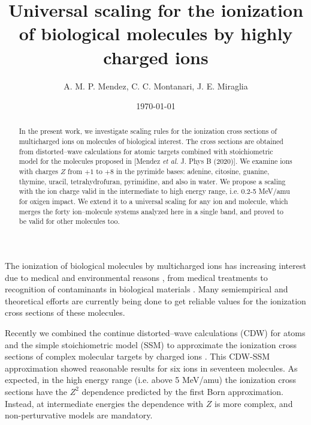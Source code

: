 \documentclass[10pt,showpacs,showkeys,twocolumn]{revtex4}
\begin{document}
\title[Universal scaling for the ionization of biological molecules]{
Universal scaling for the ionization of biological molecules by highly charged ions}
\author{A. M. P. Mendez, C. C. Montanari, J. E. Miraglia}

\date{\today}%

\begin{abstract}
In the present work, we investigate scaling rules for the ionization cross sections of multicharged ions on molecules of biological interest. The cross sections are obtained from distorted--wave calculations for atomic targets
combined with stoichiometric model for the molecules proposed in [Mendez \textit{et al.} J. Phys B (2020)]. We examine ions with charges $Z$ from $+1$ to $+8$ in the pyrimide bases: adenine, citosine, guanine, thymine, uracil, tetrahydrofuran, pyrimidine, and also in water. We propose a scaling with the ion charge valid in the intermediate to high energy range, i.e. 0.2-5 MeV/amu for oxigen impact. We extend it to a universal scaling for any ion and molecule, which merges the forty ion--molecule systems analyzed here in a single band, and proved to be valid for other molecules too.  
\end{abstract}


\maketitle


The ionization of biological molecules by multicharged ions has increasing interest due to medical and environmental reasons \cite{PhysMed}, from medical treatments  \cite{Mohamad2017,Solov2009,Denifl2011} to recognition of contaminants in biological materials \cite{water,ferrazdias}. Many semiempirical \citep{vera_prl2013} and  theoretical efforts are currently being done \cite{MendezJPB20,Quinto20,ludde2019,ludde2018,ludde2016,Champion2012} to get reliable values for the ionization cross sections of these molecules. 

Recently we combined the continue distorted--wave calculations  (CDW) for atoms and the simple stoichiometric model (SSM) to approximate the ionization cross sections of complex molecular targets by charged ions \cite{MendezJPB20}. This CDW-SSM  approximation showed reasonable results for six ions in seventeen molecules. As expected, in the high energy range (i.e. above 5 MeV/amu) the ionization cross sections  have the $Z^2$ dependence predicted by the first Born approximation. Instead, at intermediate energies the dependence with $Z$ is more complex, and non-perturvative models are mandatory.  
\end{document}
